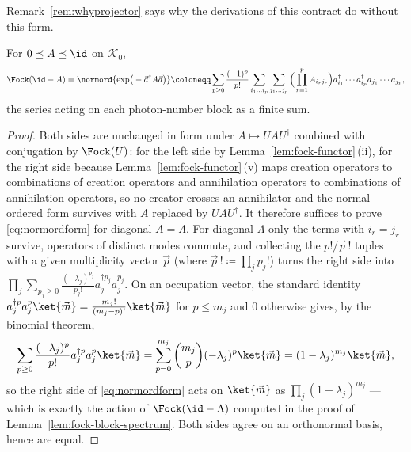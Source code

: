 
Remark~\ref{rem:whyprojector} says why the derivations of this contract do
without this form.

\begin{proposition}\label{prop:normord}
For $0\preceq A\preceq\id$ on $\mathcal{K}_0$,
\begin{equation}\label{eq:normordform}
  \Fock(\id-A)=\normord{\exp\!\big(-\vec a^\dagger A\vec a\big)}
  \coloneqq\sum_{p\ge0}\frac{(-1)^p}{p!}
  \sum_{i_1\dots i_p}\sum_{j_1\dots j_p}
  \Big(\prod_{r=1}^{p}A_{i_rj_r}\Big)
  a_{i_1}^\dagger\cdots a_{i_p}^\dagger a_{j_1}\cdots a_{j_p},
\end{equation}
the series acting on each photon-number block as a finite sum.
\end{proposition}

\begin{proof}
Both sides are unchanged in form under $A\mapsto UAU^\dagger$ combined with
conjugation by $\Fock(U)$: for the left side by
Lemma~\ref{lem:fock-functor}\,(ii), for the right side because
Lemma~\ref{lem:fock-functor}\,(v) maps creation operators to combinations of
creation operators and annihilation operators to combinations of annihilation
operators, so no creator crosses an annihilator and the normal-ordered form
survives with $A$ replaced by $UAU^\dagger$. It therefore suffices to prove
\eqref{eq:normordform} for diagonal $A=\Lambda$. For diagonal $\Lambda$ only
the terms with $i_r=j_r$ survive, operators of distinct modes commute, and
collecting the $p!/\vec p\,!$ tuples with a given multiplicity vector $\vec p$
(where $\vec p\,!\coloneqq\prod_jp_j!$) turns the right side into
$\prod_j\sum_{p_j\ge0}\frac{(-\lambda_j)^{p_j}}{p_j!}
a_j^{\dagger p_j}a_j^{p_j}$. On an occupation vector, the standard identity
$a_j^{\dagger p}a_j^{p}\ket{\vec m}=\frac{m_j!}{(m_j-p)!}\ket{\vec m}$ for
$p\le m_j$ and $0$ otherwise gives, by the binomial theorem,
\begin{equation}\label{eq:singlemode}
  \sum_{p\ge0}\frac{(-\lambda_j)^{p}}{p!}a_j^{\dagger p}a_j^{p}\ket{\vec m}
  =\sum_{p=0}^{m_j}\binom{m_j}{p}(-\lambda_j)^p\ket{\vec m}
  =(1-\lambda_j)^{m_j}\ket{\vec m} ,
\end{equation}
so the right side of \eqref{eq:normordform} acts on $\ket{\vec m}$ as
$\prod_j(1-\lambda_j)^{m_j}$ --- which is exactly the action of
$\Fock(\id-\Lambda)$ computed in the proof of Lemma~\ref{lem:fock-block-spectrum}.
Both sides agree on an orthonormal basis, hence are equal.
\end{proof}

